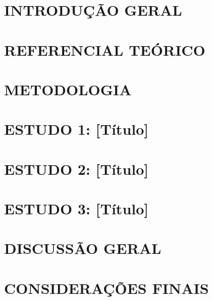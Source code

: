 \documentclass[
    12pt,
    openright,
    twoside,
    a4paper,
    chapter=TITLE,
    sumario=tradicional,
    section=TITLE,
    english,
    brazil
]{abntex2}
\begin{document}
\textual


\chapter{INTRODUÇÃO GERAL}
\chapter{REFERENCIAL TEÓRICO}
\chapter{METODOLOGIA}
\chapter{ESTUDO 1: [Título]}
\chapter{ESTUDO 2: [Título]}
\chapter{ESTUDO 3: [Título]}
\chapter{DISCUSSÃO GERAL}
\chapter{CONSIDERAÇÕES FINAIS}
\end{document}
